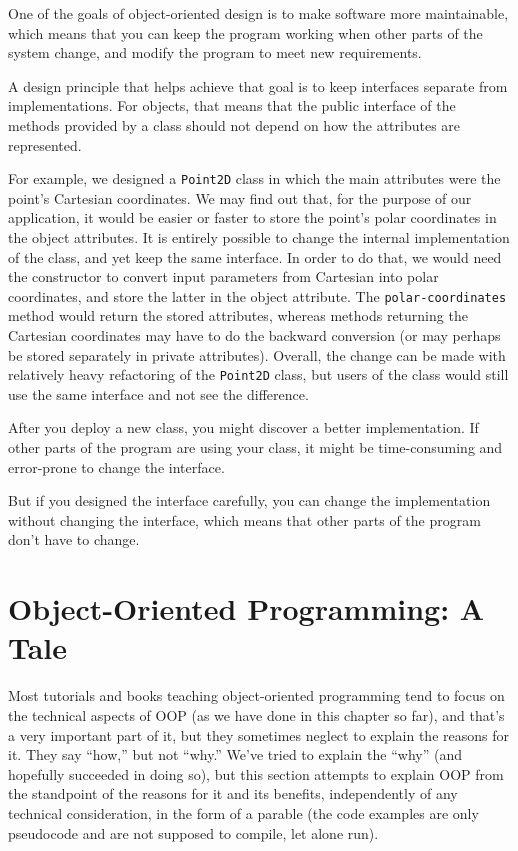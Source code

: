 One of the goals of object-oriented design is to make software more
maintainable, which means that you can keep the program working when
other parts of the system change, and modify the program to meet new
requirements.

A design principle that helps achieve that goal is to keep
interfaces separate from implementations.  For objects, that means
that the public interface of the methods provided by a class 
should not depend on how the attributes are represented.

For example, we designed a {\tt Point2D} class in which the main 
attributes were the point's Cartesian coordinates. We may find 
out that, for the purpose of our application, it would be easier 
or faster to store the point's polar coordinates in the object 
attributes. It is entirely possible to change the internal 
implementation of the class, and yet keep the same interface. 
In order to do that, we would need the constructor 
to convert input parameters from 
Cartesian into polar coordinates, and store the latter in the 
object attribute. The {\tt polar-coordinates} method would 
return the stored attributes, whereas methods returning the 
Cartesian coordinates may have to do the backward conversion 
(or may perhaps be stored separately in private attributes). 
Overall, the change can be made with relatively heavy refactoring 
of the {\tt Point2D} class, but users of the class would still 
use the same interface and not see the difference.

After you deploy a new class, you might discover a better
implementation.  If other parts of the program are using your
class, it might be time-consuming and error-prone to change the
interface.  

But if you designed the interface carefully, you can
change the implementation without changing the interface, which
means that other parts of the program don't have to change.


\section{Object-Oriented Programming: A Tale}

Most tutorials and books teaching object-oriented 
programming tend to focus on the technical aspects 
of OOP (as we have done in this chapter so far), and 
that's a very important part of it, but they sometimes 
neglect to explain the reasons for it. They say ``how,'' 
but not ``why.'' We've tried to explain the ``why'' (and 
hopefully succeeded in doing so), but this section attempts to 
explain OOP from the standpoint of the reasons for it 
and its benefits, independently of any technical 
consideration, in the form of a parable (the code 
examples are only pseudocode and are not supposed 
to compile, let alone run). 


